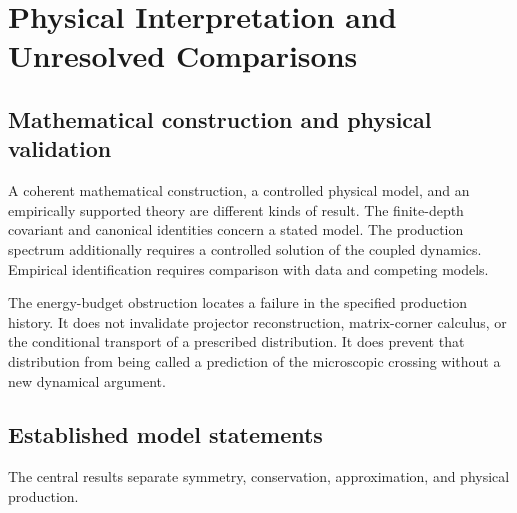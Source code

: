 \chapter{Physical Interpretation and Unresolved Comparisons}
\label{ch:assessment}

\section{Mathematical construction and physical validation}

A coherent mathematical construction, a controlled physical model, and an empirically supported theory are different kinds of result. The finite-depth covariant and canonical identities concern a stated model. The production spectrum additionally requires a controlled solution of the coupled dynamics. Empirical identification requires comparison with data and competing models.

The energy-budget obstruction locates a failure in the specified production history. It does not invalidate projector reconstruction, matrix-corner calculus, or the conditional transport of a prescribed distribution. It does prevent that distribution from being called a prediction of the microscopic crossing without a new dynamical argument.

\section{Established model statements}

The central results separate symmetry, conservation, approximation, and physical production.

